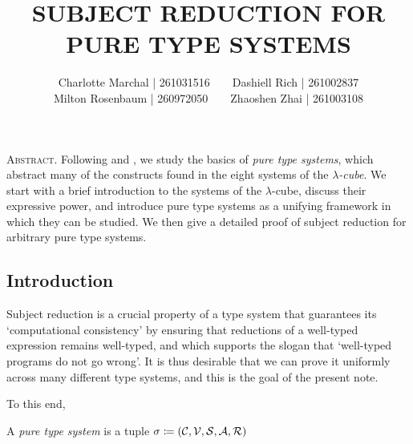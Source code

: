 \documentclass[reqno, twoside]{article}
\begin{document}
    \title{\textbf{\normalsize\MakeUppercase{Subject Reduction for Pure Type Systems}}}
    \author{\small Charlotte Marchal | 261031516\ \ \ \ Dashiell Rich | 261002837\\\small Milton Rosenbaum | 260972050\ \ \ \ Zhaoshen Zhai | 261003108}
    \date{}
    \maketitle

    \begin{center}
        \vspace{-0.3in}
        \begin{minipage}{0.85\textwidth}
            {\footnotesize{\textsc{Abstract.}} Following \cite{GN91} and \cite{Bar91}, we study the basics of \textit{pure type systems}, which abstract many of the constructs found in the eight systems of the \textit{$\lambda$-cube}. We start with a brief introduction to the systems of the $\lambda$-cube, discuss their expressive power, and introduce pure type systems as a unifying framework in which they can be studied. We then give a detailed proof of subject reduction for arbitrary pure type systems.}
        \end{minipage}
    \end{center}

    \subsection*{Introduction}

    Subject reduction is a crucial property of a type system that guarantees its `computational consistency' by ensuring that reductions of a well-typed expression remains well-typed, and which supports the slogan that `well-typed programs do not go wrong'. It is thus desirable that we can prove it uniformly across many different type systems, and this is the goal of the present note.

    To this end, 

    \begin{definition}
        A \textit{pure type system} is a tuple $\sigma\coloneqq(\mathcal{C},\mathcal{V},\mathcal{S},\mathcal{A},\mathcal{R})$ \TODO
    \end{definition}
\end{document}

